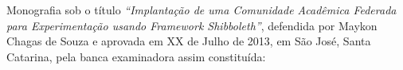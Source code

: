 %

\begin{folhadeaprovacao}
Monografia sob o título \textit{``Implantação de uma Comunidade Acadêmica Federada para Experimentação usando Framework Shibboleth''}, defendida por Maykon Chagas de Souza e aprovada em XX de Julho de 2013, em São José, Santa Catarina, pela banca examinadora assim constituída:

\setlength{\ABNTsignthickness}{0.4pt}
\setlength{\ABNTsignwidth}{10cm}
\setlength{\ABNTsignskip}{3.5cm}


\end{folhadeaprovacao}
